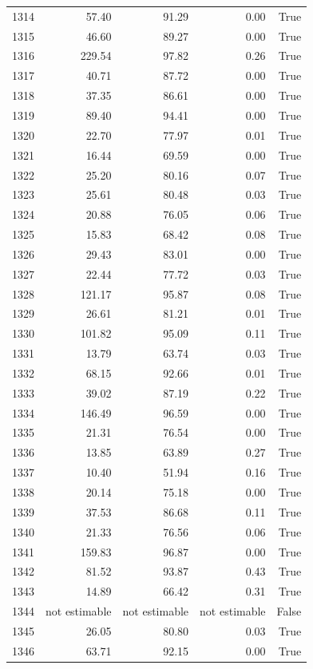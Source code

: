 \begin{longtable}{rrrrr}
1314 & 57.40 & 91.29 & 0.00 & True \\
1315 & 46.60 & 89.27 & 0.00 & True \\
1316 & 229.54 & 97.82 & 0.26 & True \\
1317 & 40.71 & 87.72 & 0.00 & True \\
1318 & 37.35 & 86.61 & 0.00 & True \\
1319 & 89.40 & 94.41 & 0.00 & True \\
1320 & 22.70 & 77.97 & 0.01 & True \\
1321 & 16.44 & 69.59 & 0.00 & True \\
1322 & 25.20 & 80.16 & 0.07 & True \\
1323 & 25.61 & 80.48 & 0.03 & True \\
1324 & 20.88 & 76.05 & 0.06 & True \\
1325 & 15.83 & 68.42 & 0.08 & True \\
1326 & 29.43 & 83.01 & 0.00 & True \\
1327 & 22.44 & 77.72 & 0.03 & True \\
1328 & 121.17 & 95.87 & 0.08 & True \\
1329 & 26.61 & 81.21 & 0.01 & True \\
1330 & 101.82 & 95.09 & 0.11 & True \\
1331 & 13.79 & 63.74 & 0.03 & True \\
1332 & 68.15 & 92.66 & 0.01 & True \\
1333 & 39.02 & 87.19 & 0.22 & True \\
1334 & 146.49 & 96.59 & 0.00 & True \\
1335 & 21.31 & 76.54 & 0.00 & True \\
1336 & 13.85 & 63.89 & 0.27 & True \\
1337 & 10.40 & 51.94 & 0.16 & True \\
1338 & 20.14 & 75.18 & 0.00 & True \\
1339 & 37.53 & 86.68 & 0.11 & True \\
1340 & 21.33 & 76.56 & 0.06 & True \\
1341 & 159.83 & 96.87 & 0.00 & True \\
1342 & 81.52 & 93.87 & 0.43 & True \\
1343 & 14.89 & 66.42 & 0.31 & True \\
1344 & not estimable & not estimable & not estimable & False \\
1345 & 26.05 & 80.80 & 0.03 & True \\
1346 & 63.71 & 92.15 & 0.00 & True \\

\end{longtable}
